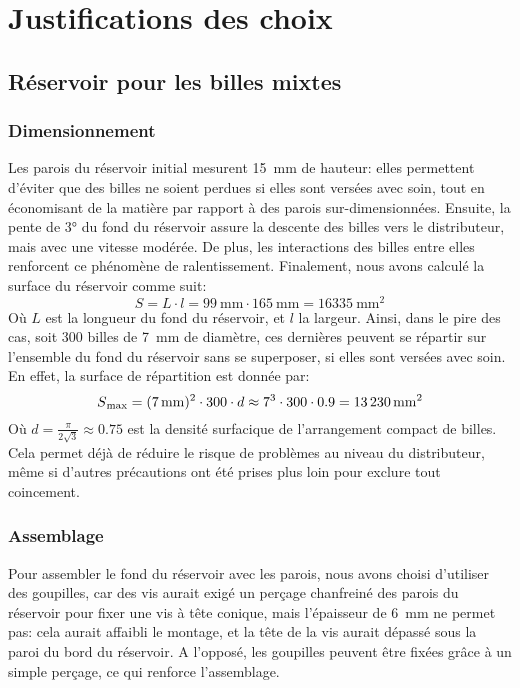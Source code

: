 \chapter{Justifications des choix}

\section{Réservoir pour les billes mixtes}

\subsection{Dimensionnement}
Les parois du réservoir initial mesurent \SI{15}{\milli\metre} de hauteur: elles permettent d'éviter que des billes ne soient perdues si elles sont versées avec soin, tout en économisant de la matière par rapport à des parois sur-dimensionnées. 
Ensuite, la pente de \ang{3} du fond du réservoir assure la descente des billes vers le distributeur, mais avec une vitesse modérée. De plus, les interactions des billes entre elles renforcent ce phénomène de ralentissement.
Finalement, nous avons calculé la surface du réservoir comme suit:
\[S = L \cdot l = \SI{99}{\milli\metre} \cdot \SI{165}{\milli\metre} = \SI{16335}{\milli\metre\squared}\]
Où $L$ est la longueur du fond du réservoir, et $l$ la largeur.
Ainsi, dans le pire des cas, soit \num{300} billes de \SI{7}{\milli\metre} de diamètre, ces dernières peuvent se répartir sur l'ensemble du fond du réservoir sans se superposer, si elles sont versées avec soin. En effet, la surface de répartition est donnée par:
\[S\textsubscript{max} = (\SI{7}{\milli\metre})^{2} \cdot \num{300} \cdot d \approx {\num{7}}^{3} \cdot 300 \cdot 0.9 = \SI{13230}{\milli\metre\squared}\]
Où \(d = \frac{ \pi }{2\sqrt{3}} \approx \num{0.75}\) est la densité surfacique de l'arrangement compact de billes.
Cela permet déjà de réduire le risque de problèmes au niveau du distributeur, même si d'autres précautions ont été prises plus loin pour exclure tout coincement.

\subsection{Assemblage}
Pour assembler le fond du réservoir avec les parois, nous avons choisi d'utiliser des goupilles, car des vis aurait exigé un perçage chanfreiné des parois du réservoir pour fixer une vis à tête conique, mais l'épaisseur de \SI{6}{\mm} ne permet pas: cela aurait affaibli le montage, et la tête de la vis aurait dépassé sous la paroi du bord du réservoir. A l'opposé, les goupilles peuvent être fixées grâce à un simple perçage, ce qui renforce l'assemblage.

